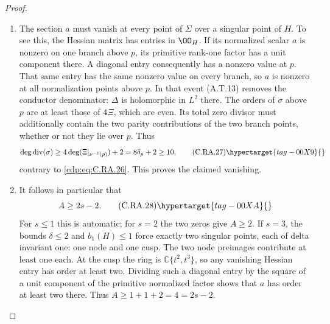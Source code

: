 \begin{proof}
\begin{enumerate}[label={$\langle1\rangle$\arabic*.},leftmargin=*]
\item The section $a$ must vanish at every point of $\Sigma$
over a singular point of $H$. To see this, the Hessian
matrix has entries in $\OO_H$. If its normalized scalar
$a$ is nonzero on one branch above $p$, its primitive
rank-one factor has a unit component there. A diagonal
entry consequently has a nonzero value at $p$. That
same entry has the same nonzero value on every branch,
so $a$ is nonzero at all normalization points above $p$.
In that event (A.T.13) removes the conductor denominator:
$\Delta$ is holomorphic in $L^2$ there. The orders of
$\sigma$ above $p$ are at least those of $4\Xi$,
which are even. Its total zero divisor must additionally
contain the two parity contributions of the two branch
points, whether or not they lie over $p$. Thus
\[
 \deg\operatorname{div}(\sigma)
       \ge4\deg(\Xi|_{\nu^{-1}(p)})+2
       =8\delta_p+2\ge10,
\tag{C.RA.27}\hypertarget{tag-00X9}{}\label{cdp:eq:C.RA.27}
\]
contrary to \eqref{cdp:eq:C.RA.26}. This proves the claimed vanishing.

\item It follows in particular that
\[
                              A\ge2s-2.
\tag{C.RA.28}\hypertarget{tag-00XA}{}\label{cdp:eq:C.RA.28}
\]
For $s\le1$ this is automatic; for $s=2$ the two
zeros give $A\ge2$. If $s=3$, the bounds
$\delta\le2$ and $b_1(H)\le1$ force exactly two
singular points, each of delta invariant one: one node
and one cusp. The two node preimages contribute at
least one each. At the cusp the ring is
$\mathbb C\{t^2,t^3\}$, so any vanishing Hessian entry
has order at least two. Dividing such a diagonal entry
by the square of a unit component of the primitive
normalized factor shows that $a$ has order at least
two there. Thus $A\ge1+1+2=4=2s-2$.


\end{enumerate}
\end{proof}
